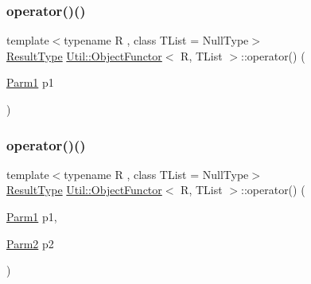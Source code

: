 \subsubsection{\texorpdfstring{operator()()}{operator()()}\hspace{0.1cm}{\footnotesize\ttfamily [6/18]}}
{\footnotesize\ttfamily template$<$typename R , class T\+List  = Null\+Type$>$ \\
\mbox{\hyperlink{classUtil_1_1ObjectFunctor_a77f816e98108848347d0dfc085090a1c}{Result\+Type}} \mbox{\hyperlink{classUtil_1_1ObjectFunctor}{Util\+::\+Object\+Functor}}$<$ R, T\+List $>$\+::operator() (\begin{DoxyParamCaption}\item[{\mbox{\hyperlink{classUtil_1_1ObjectFunctor_a199715d28029627c2ae7219c13b04d26}{Parm1}}}]{p1 }\end{DoxyParamCaption})\hspace{0.3cm}{\ttfamily [inline]}}

\mbox{\label{classUtil_1_1ObjectFunctor_a95148ad6414e7e28998227841c27be6c}} 
\subsubsection{\texorpdfstring{operator()()}{operator()()}\hspace{0.1cm}{\footnotesize\ttfamily [7/18]}}
{\footnotesize\ttfamily template$<$typename R , class T\+List  = Null\+Type$>$ \\
\mbox{\hyperlink{classUtil_1_1ObjectFunctor_a77f816e98108848347d0dfc085090a1c}{Result\+Type}} \mbox{\hyperlink{classUtil_1_1ObjectFunctor}{Util\+::\+Object\+Functor}}$<$ R, T\+List $>$\+::operator() (\begin{DoxyParamCaption}\item[{\mbox{\hyperlink{classUtil_1_1ObjectFunctor_a199715d28029627c2ae7219c13b04d26}{Parm1}}}]{p1,  }\item[{\mbox{\hyperlink{classUtil_1_1ObjectFunctor_a6809cf65883dc7575e01d9b9849649cf}{Parm2}}}]{p2 }\end{DoxyParamCaption})\hspace{0.3cm}{\ttfamily [inline]}}

\mbox{\label{classUtil_1_1ObjectFunctor_a95148ad6414e7e28998227841c27be6c}} 
